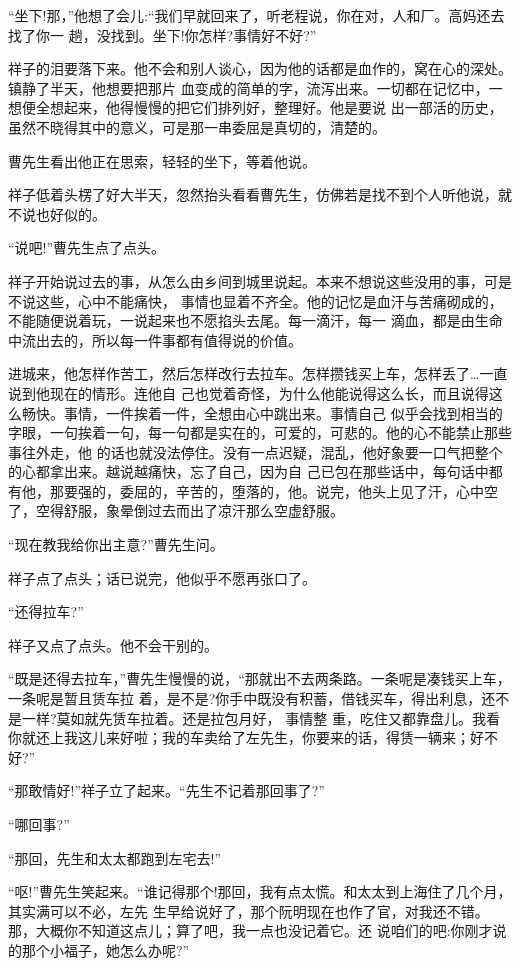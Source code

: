 \documentclass[11pt,a4paper,onecolumn]{article}
\begin{document}
``坐下!那\myrule ，''他想了会儿:``我们早就回来了，听老程说，你在\myrule 对，人和厂。高妈还去找了你一
趟，没找到。坐下!你怎样?事情好不好?''

祥子的泪要落下来。他不会和别人谈心，因为他的话都是血作的，窝在心的深处。镇静了半天，他想要把那片
血变成的简单的字，流泻出来。一切都在记忆中，一想便全想起来，他得慢慢的把它们排列好，整理好。他是要说
出一部活的历史，虽然不晓得其中的意义，可是那一串委屈是真切的，清楚的。

曹先生看出他正在思索，轻轻的坐下，等着他说。

祥子低着头楞了好大半天，忽然抬头看看曹先生，仿佛若是找不到个人听他说，就不说也好似的。

``说吧!''曹先生点了点头。

祥子开始说过去的事，从怎么由乡间到城里说起。本来不想说这些没用的事，可是不说这些，心中不能痛快，
事情也显着不齐全。他的记忆是血汗与苦痛砌成的，不能随便说着玩，一说起来也不愿掐头去尾。每一滴汗，每一
滴血，都是由生命中流出去的，所以每一件事都有值得说的价值。

进城来，他怎样作苦工，然后怎样改行去拉车。怎样攒钱买上车，怎样丢了\ldots 一直说到他现在的情形。连他自
己也觉着奇怪，为什么他能说得这么长，而且说得这么畅快。事情，一件挨着一件，全想由心中跳出来。事情自己
似乎会找到相当的字眼，一句挨着一句，每一句都是实在的，可爱的，可悲的。他的心不能禁止那些事往外走，他
的话也就没法停住。没有一点迟疑，混乱，他好象要一口气把整个的心都拿出来。越说越痛快，忘了自己，因为自
己已包在那些话中，每句话中都有他，那要强的，委屈的，辛苦的，堕落的，他。说完，他头上见了汗，心中空
了，空得舒服，象晕倒过去而出了凉汗那么空虚舒服。

``现在教我给你出主意?''曹先生问。

祥子点了点头；话已说完，他似乎不愿再张口了。

``还得拉车?''

祥子又点了点头。他不会干别的。

``既是还得去拉车，''曹先生慢慢的说，``那就出不去两条路。一条呢是凑钱买上车，一条呢是暂且赁车拉
着，是不是?你手中既没有积蓄，借钱买车，得出利息，还不是一样?莫如就先赁车拉着。还是拉包月好， 事情整
重，吃住又都靠盘儿。我看你就还上我这儿来好啦；我的车卖给了左先生，你要来的话，得赁一辆来；好不好?''

``那敢情好!''祥子立了起来。``先生不记着那回事了?''

``哪回事?''

``那回，先生和太太都跑到左宅去!''

``呕!''曹先生笑起来。``谁记得那个!那回，我有点太慌。和太太到上海住了几个月，其实满可以不必，左先
生早给说好了，那个阮明现在也作了官，对我还不错。那，大概你不知道这点儿；算了吧，我一点也没记着它。还
说咱们的吧:你刚才说的那个小福子，她怎么办呢?''
\end{document}
